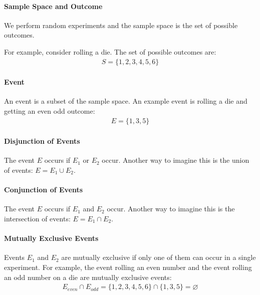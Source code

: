 

\paragraph{Sample Space and Outcome}
We perform random experiments and the sample space is the set of possible
outcomes.

For example, consider rolling a die. The set of possible outcomes are:
\begin{equation*} \begin{split}
	S = \{1,2,3,4,5,6\}
\end{split} \end{equation*}

\paragraph{Event} An event is a subset of the sample space. An example event is
rolling a die and getting an even odd outcome:
\begin{equation*} \begin{split}
	E = \{1,3,5\}
\end{split} \end{equation*}

\paragraph{Disjunction of Events} The event $E$ occurs if $E_1$ or $E_2$ occur.
Another way to imagine this is the union of events: $E = E_1 \cup E_2$.

\paragraph{Conjunction of Events} The event $E$ occurs if $E_1$ and $E_2$ occur.
Another way to imagine this is the intersection of events: $E = E_1 \cap E_2$.

\paragraph{Mutually Exclusive Events} Events $E_1$ and $E_2$ are mutually
exclusive if only one of them can occur in a single experiment. For example, the
event rolling an even number and the event rolling an odd number on a die are
mutually exclusive events:
\begin{equation*} \begin{split}
E_{even} \cap E_{odd} =  \{1,2,3,4,5,6\} \cap \{1,3,5\} = \varnothing
\end{split} \end{equation*}

